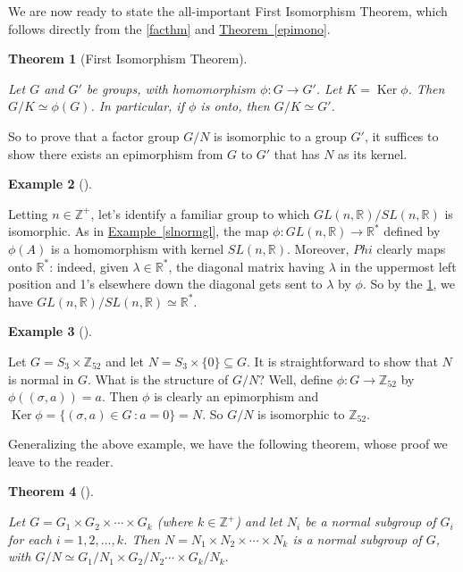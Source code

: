 \documentclass[10pt,]{book}
\theoremstyle{plain}
\newtheorem{theorem}{Theorem}[section]
\theoremstyle{definition}
\theoremstyle{definition}
\theoremstyle{definition}
\newtheorem{example}[theorem]{Example}
\theoremstyle{definition}
\numberwithin{equation}{section}
\def\Z{\mathbb{Z}}
\def\R{\mathbb{R}}
\DeclareMathOperator{\Ker}{Ker}
\begin{document}
    We are now ready to state the all-important First Isomorphism
    Theorem, which follows directly from the \hyperref[facthm]{\ref{facthm}}  and
      \hyperref[epimono]{Theorem~\ref{epimono}}.
\begin{theorem}[{First Isomorphism Theorem}]\label{fit}

       Let \(G\) and \(G'\)
        be groups, with homomorphism \(\phi:G \rightarrow G'\). Let \(K=\Ker
        \phi\). Then \(G/K \simeq \phi(G)\). In particular, if \(\phi\) is onto,
        then \(G/K\simeq G'\).
\end{theorem}
\par

    So to prove that a factor group \(G/N\) is isomorphic to a group
    \(G'\), it suffices to show there exists an epimorphism from \(G\) to
    \(G'\) that has \(N\) as its kernel.
\begin{example}[]\label{example-88}

        Letting \(n\in \Z^+\), let's identify a familiar group to which
        \(GL(n,\R)/SL(n,\R)\) is isomorphic. As in \hyperref[slnormgl]{Example~\ref{slnormgl}}, the map \(\phi:GL(n,\R)\to \R^*\) defined by
        \(\phi(A)\) is a homomorphism with kernel \(SL(n,\R)\). Moreover,
        \(Phi\) clearly maps onto \(\R^*\): indeed, given \(\lambda \in
        \R^*\), the diagonal matrix having \(\lambda\) in the uppermost left
        position and 1's elsewhere down the diagonal gets sent to \(\lambda\)
        by \(\phi\). So by the \hyperref[fit]{\ref{fit}}, we have
        \(GL(n,\R)/SL(n,\R) \simeq \R^*\).
\end{example}
\begin{example}[]\label{example-89}

        Let \(G=S_3\times \Z_{52}\) and let \(N=S_3 \times
        \{0\}\subseteq G\). It is straightforward to show that \(N\) is normal
        in \(G\). What is the structure of \(G/N\)? Well, define \(\phi:G\to
        \Z_{52}\) by \(\phi((\sigma, a))=a\). Then \(\phi\) is clearly an
        epimorphism and \(\Ker \phi=\{(\sigma,a)\in G\,:a=0\}=N\). So \(G/N\) is
        isomorphic to \(\Z_{52}\).
\end{example}
\par

    Generalizing the above example, we have the following theorem, whose
    proof we leave to the reader.
\begin{theorem}[{}]\label{theorem-61}

        Let \(G=G_1\times G_2 \times \cdots \times G_k\) (where
        \(k\in \Z^+\)) and let \(N_i\) be a normal subgroup of \(G_i\) for each
        \(i=1,2,\ldots, k\). Then \(N=N_1 \times N_2 \times \cdots \times N_k\)
        is a normal subgroup of \(G\), with \(G/N \simeq G_1/N_1 \times G_2/N_2
        \cdots \times G_k/N_k.\)
\end{theorem}
\par
\end{document}
